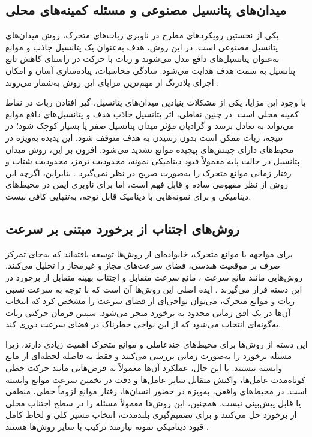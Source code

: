 \subsection{میدان‌های پتانسیل مصنوعی و مسئله کمینه‌های محلی}

یکی از نخستین رویکردهای مطرح در ناوبری ربات‌های متحرک، روش میدان‌های پتانسیل مصنوعی%
است. در این روش، هدف به‌عنوان یک پتانسیل جاذب و موانع به‌عنوان پتانسیل‌های دافع مدل می‌شوند و ربات با حرکت در راستای کاهش تابع پتانسیل به سمت هدف هدایت می‌شود. سادگی محاسبات، پیاده‌سازی آسان و امکان اجرای بلادرنگ از مهم‌ترین مزایای این روش به‌شمار می‌روند %
\cite{khatib1986}.

با وجود این مزایا، یکی از مشکلات بنیادین میدان‌های پتانسیل، گیر افتادن ربات در نقاط کمینه محلی%
است. در چنین نقاطی، اثر پتانسیل جاذب هدف و پتانسیل‌های دافع موانع می‌تواند به تعادل برسد و گرادیان مؤثر میدان پتانسیل صفر یا بسیار کوچک شود؛ در نتیجه، ربات ممکن است بدون رسیدن به هدف متوقف شود. این پدیده به‌ویژه در محیط‌های دارای چینش‌های پیچیده موانع تشدید می‌شود. افزون بر این، روش میدان پتانسیل در حالت پایه معمولاً قیود دینامیکی نمونه، محدودیت ترمز، محدودیت شتاب و رفتار زمانی موانع متحرک را به‌صورت صریح در نظر نمی‌گیرد %
\cite{LaValle2006Planning,Choset2005Principles, Koren1991PotentialFields}.
بنابراین، اگرچه این روش از نظر مفهومی ساده و قابل فهم است، اما برای ناوبری ایمن در محیط‌های دینامیکی و برای نمونه‌هایی با دینامیک قابل توجه، به‌تنهایی کافی نیست.

\subsection{روش‌های اجتناب از برخورد مبتنی بر سرعت}

برای مواجهه با موانع متحرک، خانواده‌ای از روش‌ها توسعه یافته‌اند که به‌جای تمرکز صرف بر موقعیت هندسی، فضای سرعت‌های مجاز و غیرمجاز را تحلیل می‌کنند. روش‌هایی مانند مانع سرعت%
،
مانع سرعت متقابل%
و اجتناب بهینه متقابل از برخورد%
در این دسته قرار می‌گیرند %
\cite{Fiorini1998VO,VanDenBerg2008RVO,VanDenBerg2011ORCA}.
ایده اصلی این روش‌ها آن است که با توجه به سرعت نسبی ربات و موانع متحرک، می‌توان نواحی‌ای از فضای سرعت را مشخص کرد که انتخاب آن‌ها در یک افق زمانی محدود به برخورد منجر می‌شود. سپس فرمان حرکتی ربات به‌گونه‌ای انتخاب می‌شود که از این نواحی خطرناک در فضای سرعت دوری کند.

این دسته از روش‌ها برای محیط‌های چندعاملی و موانع متحرک اهمیت زیادی دارند، زیرا مسئله برخورد را به‌صورت زمانی بررسی می‌کنند و فقط به فاصله لحظه‌ای از مانع وابسته نیستند. با این حال، عملکرد آن‌ها معمولاً به فرض‌هایی مانند حرکت خطی کوتاه‌مدت عامل‌ها، واکنش متقابل سایر عامل‌ها و دقت در تخمین سرعت موانع وابسته است. در محیط‌های واقعی، به‌ویژه در حضور انسان‌ها، رفتار موانع لزوماً خطی، منطقی یا قابل پیش‌بینی نیست. همچنین، این روش‌ها معمولاً مسئله را در سطح اجتناب محلی از برخورد حل می‌کنند و برای تصمیم‌گیری بلندمدت، انتخاب مسیر کلی و لحاظ کامل قیود دینامیکی نمونه نیازمند ترکیب با سایر روش‌ها هستند %
\cite{LaValle2006Planning, Fiorini1998VO,VanDenBerg2008RVO,VanDenBerg2011ORCA}.


